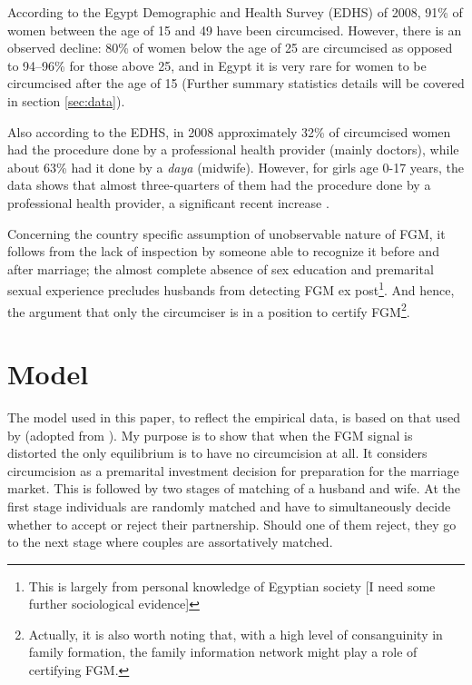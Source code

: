 \documentclass[12pt]{article}
\begin{document}
According to the Egypt Demographic and Health Survey (EDHS) of 2008, 91\% of women between the age of 15 and 49 have been circumcised.  However, there is an observed decline: 80\% of women below the age of 25 are circumcised as opposed to 94--96\% for those above 25, and in Egypt it is very rare for women to be circumcised after the age of 15 \citep{El-Zanat, El-Gibaly2002} (Further summary statistics details will be covered in section \ref{sec:data}).  

Also according to the EDHS, in 2008 approximately 32\% of circumcised women had the procedure done by a professional health provider (mainly doctors), while about 63\% had it done by a \emph{daya} (midwife). However, for girls age 0-17 years, the data shows that almost three-quarters of them had the procedure done by a professional health provider, a significant recent increase \citep{El-Zanat}.

Concerning the country specific assumption of unobservable nature of FGM, it follows from the lack of inspection by someone able to recognize it before and after marriage; the almost complete absence of sex education and premarital sexual experience precludes husbands from detecting FGM ex post\footnote{This is largely from personal knowledge of Egyptian society [I need some further sociological evidence]}.  And hence, the argument that only the circumciser is in a position to certify FGM\footnote{Actually, it is also worth noting that, with a high level of consanguinity in family formation, the family information network might play a role of certifying FGM.}.

\section{Model}

The model used in this paper, to reflect the empirical data, is based on that used by \citet{Chesnokova2007} (adopted from \citet{Fernandez2005}).  My purpose is to show that when the FGM signal is distorted the only equilibrium is to have no circumcision at all.  It considers circumcision as a premarital investment decision for preparation for the marriage market.  This is followed by two stages of matching of a husband and wife.  At the first stage individuals are randomly matched and have to simultaneously decide whether to accept or reject their partnership.  Should one of them reject, they go to the next stage where couples are assortatively matched.
\end{document}
